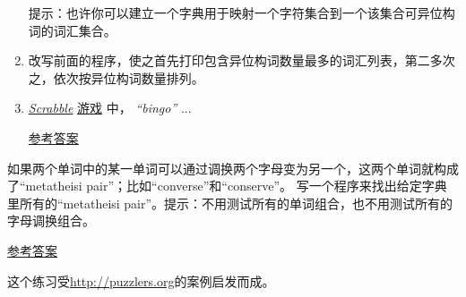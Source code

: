 \begin{exercise}
\begin{enumerate}
提示：也许你可以建立一个字典用于映射一个字符集合到一个该集合可异位构词的词汇集合。

\item 改写前面的程序，使之首先打印包含异位构词数量最多的词汇列表，第二多次之，依次按异位构词数量排列。

\item \href{https://en.wikipedia.org/wiki/Scrabble}{{\em Scrabble}} \href{https://zh.wikipedia.org/wiki/Scrabble}{游戏} 中， {\em “bingo”} ...

\href{http://thinkpython2.com/code/anagram_sets.py}{参考答案}

\end{enumerate}

\end{exercise}

\begin{exercise}


如果两个单词中的某一单词可以通过调换两个字母变为另一个，这两个单词就构成了``metatheisi pair''；比如``converse''和``conserve''。 写一个程序来找出给定字典里所有的``metatheisi pair''。提示：不用测试所有的单词组合，也不用测试所有的字母调换组合。

\href{http://thinkpython2.com/code/metathesis.py}{参考答案}

这个练习受\href{http://puzzlers.org}{http://puzzlers.org}的案例启发而成。

\end{exercise}


